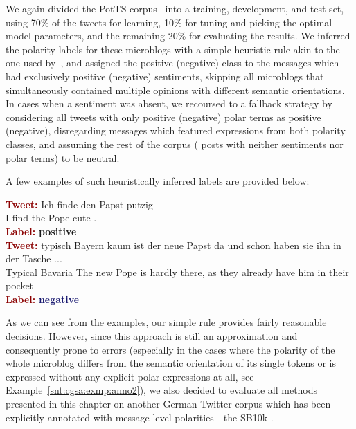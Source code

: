 We again divided the PotTS corpus~\cite{Sidarenka:16} into a training,
development, and test set, using 70\% of the tweets for learning, 10\%
for tuning and picking the optimal model parameters, and the remaining
20\% for evaluating the results.  We inferred the polarity labels for
these microblogs with a simple heuristic rule akin to the one used
by~\citet{Wiebe:05a}, and assigned the positive (negative) class to
the messages which had exclusively positive (negative) sentiments,
skipping all microblogs that simultaneously contained multiple
opinions with different semantic orientations.  In cases when a
sentiment was absent, we recoursed to a fallback strategy by
considering all tweets with only positive (negative) polar terms as
positive (negative), disregarding messages which featured expressions
from both polarity classes, and assuming the rest of the corpus (\ie{}
posts with neither sentiments nor polar terms) to be neutral.

A few examples of such heuristically inferred labels are provided
below:
\begin{example}\label{snt:cgsa:exmp:anno1}
  \noindent\textup{\bfseries\textcolor{darkred}{Tweet:}} {\upshape Ich finde den Papst putzig \smiley{}}\\
  \noindent I find the Pope cute \smiley{}.\\
  \noindent\textup{\bfseries\textcolor{darkred}{Label:}}\hspace*{2em}\textbf{%
    \upshape\textcolor{green3}{positive}}\\[1.5em]
  \noindent\textup{\bfseries\textcolor{darkred}{Tweet:}} {\upshape typisch Bayern kaum ist der neue Papst da und schon haben
  sie ihn in der Tasche ...}\\
  \noindent Typical Bavaria The new Pope is hardly there, as they already have him in their pocket\\
  \noindent\textup{\bfseries\textcolor{darkred}{Label:}}\hspace*{2em}\textbf{%
    \upshape\textcolor{midnightblue}{negative}}
\end{example}
As we can see from the examples, our simple rule provides fairly
reasonable decisions.  However, since this approach is still an
approximation and consequently prone to errors (especially in the
cases where the polarity of the whole microblog differs from the
semantic orientation of its single tokens or is expressed without any
explicit polar expressions at all, see
Example~\ref{snt:cgsa:exmp:anno2}), we also decided to evaluate all
methods presented in this chapter on another German Twitter corpus
which has been explicitly annotated with message-level
polarities---the SB10k \cite{Cieliebak:17}.

